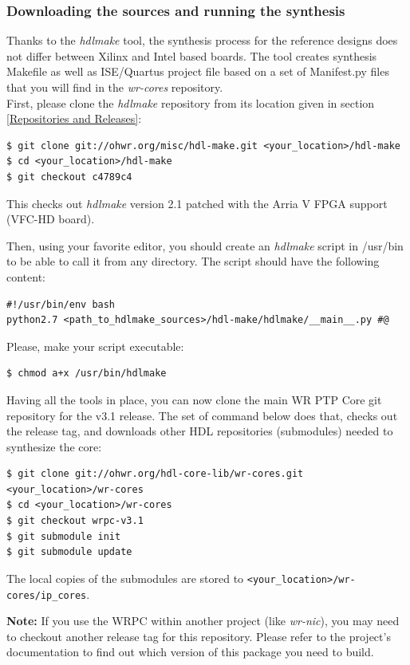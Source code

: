 \documentclass[a4paper, 12pt]{article}
\begin{document}
\subsubsection{Downloading the sources and running the synthesis}
Thanks to the \textit{hdlmake} tool, the synthesis process for the reference
designs does not differ between Xilinx and Intel based boards. The tool creates
synthesis Makefile as well as ISE/Quartus project file based on a set of
Manifest.py files that you will find in the \textit{wr-cores} repository.\\

First, please clone the \textit{hdlmake} repository from its location given in
section \ref{Repositories and Releases}:
\begin{lstlisting}
$ git clone git://ohwr.org/misc/hdl-make.git <your_location>/hdl-make
$ cd <your_location>/hdl-make
$ git checkout c4789c4
\end{lstlisting}
This checks out \textit{hdlmake} version 2.1 patched with the Arria V FPGA
support (VFC-HD board).

Then, using your favorite editor, you should create an \textit{hdlmake} script in
/usr/bin to be able to call it from any directory. The script should have the
following content:
\begin{lstlisting}
#!/usr/bin/env bash
python2.7 <path_to_hdlmake_sources>/hdl-make/hdlmake/__main__.py #@
\end{lstlisting}

Please, make your script executable:
\begin{lstlisting}
$ chmod a+x /usr/bin/hdlmake
\end{lstlisting}

Having all the tools in place, you can now clone the main WR PTP Core git
repository for the v3.1 release. The set of command below does that, checks out
the release tag, and downloads other HDL repositories (submodules) needed to
synthesize the core:
\begin{lstlisting}
$ git clone git://ohwr.org/hdl-core-lib/wr-cores.git <your_location>/wr-cores
$ cd <your_location>/wr-cores
$ git checkout wrpc-v3.1
$ git submodule init
$ git submodule update
\end{lstlisting}

The local copies of the submodules are stored to
\texttt{<your\_location>/wr-cores/ip\_cores}.

\vspace{1em}
\textbf{Note:} If you use the WRPC within another project (like
\textit{wr-nic}), you may need to checkout another release tag for this
repository. Please refer to the project's documentation to find out which
version of this package you need to build.
\end{document}
